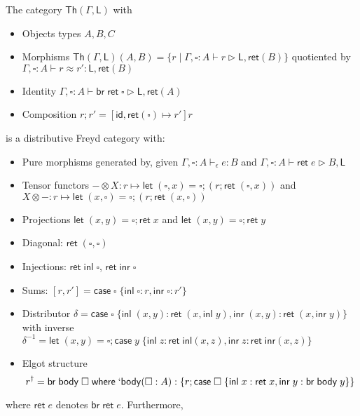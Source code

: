 \documentclass[acmsmall,screen,review]{acmart}
\newcommand{\ms}[1]{\ensuremath{\mathsf{#1}}}
\newcommand{\lbl}[1]{{`#1}}
\newcommand{\lto}{:}
\newcommand{\linl}[1]{\ms{inl}\;{#1}}
\newcommand{\linr}[1]{\ms{inr}\;{#1}}
\newcommand{\casestmt}[5]{\ms{case}\;#1\;\{\linl{#2} \lto #3, \linr{#4} \lto #5\}}
\newcommand{\where}[2]{#1\;\ms{where}\;#2}
\newcommand{\wbranch}[3]{#1(#2) \lto \{#3\}}
\newcommand{\lwbranch}[3]{\wbranch{\lbl{#1}}{#2}{#3}}
\newcommand{\bhyp}[2]{#1 : #2}
\newcommand{\hasty}[4]{#1 \vdash_{#2} #3: {#4}}
\newcommand{\haslb}[3]{#1 \vdash #2 \rhd #3}
\newcommand{\teqv}{\approx}
\newcommand{\lbeq}[4]{#1 \vdash #2 \teqv #3 : {#4}}
\begin{document}
\begin{theorem}
  The category $\ms{Th}(\Gamma, \ms{L})$ with
  \begin{itemize}
    \item Objects types $A, B, C$
    \item Morphisms $\ms{Th}(\Gamma, \ms{L})(A, B) 
      = \{r \mid \haslb{\Gamma, \bhyp{\square}{A}}{r}{\ms{L}, \ms{ret}(B)}\}$ quotiented by
      $\lbeq{\Gamma, \bhyp{\square}{A}}{r}{r'}{\ms{L}, \ms{ret}(B)}$
    \item Identity $\haslb{\Gamma, \bhyp{\square}{A}}{\ms{br}\;\ms{ret}\;\square}{\ms{L}, \ms{ret}(A)}$
    \item Composition $r;r' = [\ms{id}, \ms{ret}(\square) \mapsto r']r$ 
  \end{itemize}
  is a distributive Freyd category with:
  \begin{itemize}
    \item Pure morphisms generated by, given $\hasty{\Gamma, \bhyp{\square}{A}}{\epsilon}{e}{B}$ and
          $\haslb{\Gamma, \bhyp{\square}{A}}{\ms{ret}\;e}{B, \ms{L}}$
    \item Tensor functors 
      $- \otimes X : r \mapsto \ms{let}\;(\square, x) 
        = \square; (r ; \ms{ret}\;(\square, x))$
      and 
      $X \otimes - : r \mapsto \ms{let}\;(x, \square) 
      = \square; (r ; \ms{ret}\;(x, \square))$
    \item Projections $\ms{let}\;(x, y) = \square; \ms{ret}\;x$ and  
      $\ms{let}\;(x, y) = \square; \ms{ret}\;y$
    \item Diagonal: $\ms{ret}\;(\square, \square)$
    \item Injections: $\ms{ret}\;\ms{inl}\;\square$, $\ms{ret}\;\ms{inr}\;\square$
    \item Sums: $
      [r, r'] = \casestmt{\square}{\square}{r}{\square}{r'}
    $
    \item Distributor
      $\delta = \casestmt{\square}{(x, y)}{\ms{ret}\;(x, \ms{inl}\;y)}{(x, y)}{\ms{ret}\;(x, \ms{inr}\;y)}$
      with inverse
      $\delta^{-1} = \ms{let}\;(x, y) = \square; 
        \casestmt{y}{z}{\ms{ret}\;\ms{inl}(x, z)}{z}{\ms{ret}\;\ms{inr}(x, z)}$
    \item Elgot structure 
    $$
      r^\dagger = \where{\ms{br}\;\ms{body}\;\square}{\lwbranch{\ms{body}}{\square : A}
        {r ; \casestmt{\square}{x}{\ms{ret}\;x}{y}{\ms{br}\;\ms{body}\;y}}}
    $$
  \end{itemize}
  where $\ms{ret}\;e$ denotes $\ms{br}\;\ms{ret}\;e$. Furthermore,

\end{theorem}
\end{document}
